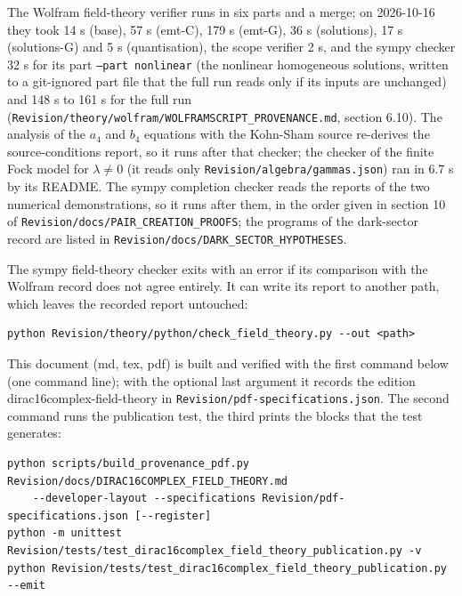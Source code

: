 \documentclass[11pt]{article}
\begin{document}
The Wolfram field-theory verifier runs in six parts and a merge; on 2026-10-16 they took 14 s (base), 57 s (emt-C), 179 s (emt-G), 36 s (solutions), 17 s (solutions-G) and 5 s (quantisation), the scope verifier 2 s, and the sympy checker 32 s for its part \texttt{--part n\allowbreak{}onlinear} (the nonlinear homogeneous solutions, written to a git-ignored part file that the full run reads only if its inputs are unchanged) and 148 s to 161 s for the full run (\texttt{Revision\allowbreak{}/theory/\allowbreak{}wolfram/\allowbreak{}WOLFRAMS\allowbreak{}CRIPT\_PR\allowbreak{}OVENANCE\allowbreak{}.md}, section 6.10). The analysis of the $a_4$ and $b_4$ equations with the Kohn-Sham source re-derives the source-conditions report, so it runs after that checker; the checker of the finite Fock model for $\lambda \neq 0$ (it reads only \texttt{Revision\allowbreak{}/algebra\allowbreak{}/gammas.\allowbreak{}json}) ran in 6.7 s by its README. The sympy completion checker reads the reports of the two numerical demonstrations, so it runs after them, in the order given in section 10 of \texttt{Revision\allowbreak{}/docs/PA\allowbreak{}IR\_CREAT\allowbreak{}ION\_PROO\allowbreak{}FS}; the programs of the dark-sector record are listed in \texttt{Revision\allowbreak{}/docs/DA\allowbreak{}RK\_SECTO\allowbreak{}R\_HYPOTH\allowbreak{}ESES}.

The sympy field-theory checker exits with an error if its comparison with the Wolfram record does not agree entirely. It can write its report to another path, which leaves the recorded report untouched:

\begin{Verbatim}[fontsize=\small]
python Revision/theory/python/check_field_theory.py --out <path>
\end{Verbatim}

This document (md, tex, pdf) is built and verified with the first command below (one command line); with the optional last argument it records the edition dirac16complex-field-theory in \texttt{Revision\allowbreak{}/pdf-spe\allowbreak{}cificati\allowbreak{}ons.json}. The second command runs the publication test, the third prints the blocks that the test generates:

\begin{Verbatim}[fontsize=\small]
python scripts/build_provenance_pdf.py Revision/docs/DIRAC16COMPLEX_FIELD_THEORY.md
    --developer-layout --specifications Revision/pdf-specifications.json [--register]
python -m unittest Revision/tests/test_dirac16complex_field_theory_publication.py -v
python Revision/tests/test_dirac16complex_field_theory_publication.py --emit
\end{Verbatim}
\end{document}
